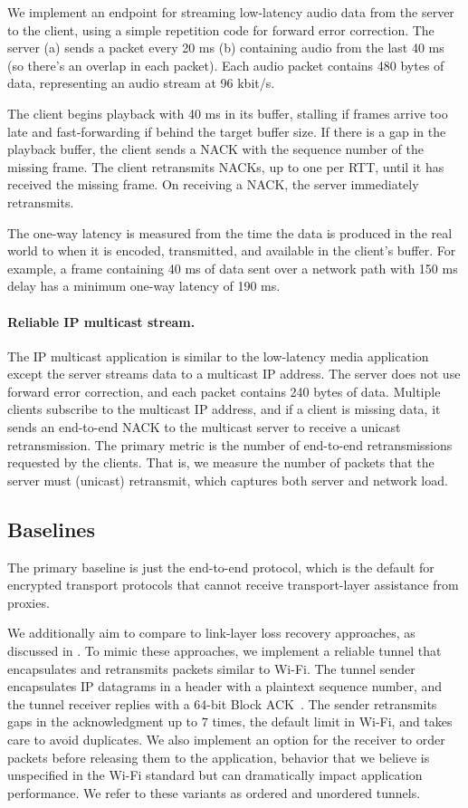 We implement an endpoint for streaming low-latency audio data from the server
to the client, using a simple repetition code for forward error correction.
The server (a) sends a packet every 20 ms
(b) containing audio from the last 40 ms (so there's an overlap in each
packet). Each audio packet contains 480 bytes of data, representing an audio
stream at 96 kbit/s.

The client begins playback with 40 ms in its buffer, stalling if frames arrive
too late and fast-forwarding if behind the target buffer size.
If there is a gap in the
playback buffer, the client sends a NACK with the sequence number of the
missing frame. The client retransmits NACKs, up to one per RTT, until it has
received the missing frame. On receiving a NACK, the server immediately
retransmits.

The one-way latency is measured from the time the data is produced in the real
world to when it is encoded, transmitted, and available in the client's
buffer. For example, a frame containing 40 ms of data sent over a network path
with 150 ms delay has a minimum one-way latency of 190 ms.

\paragraph{Reliable IP multicast stream.}

The IP multicast application is similar to the low-latency media application
except the server streams data to a multicast IP address. The server does not
use forward error correction, and each packet contains 240 bytes of data. Multiple clients
subscribe to the multicast IP address, and if a client is missing data,
it sends an end-to-end NACK to the
multicast server to receive a unicast retransmission.
The primary metric is the number of end-to-end retransmissions requested by
the clients. That is, we measure the number of packets that the server
must (unicast) retransmit, which captures both server and network load.

\subsection{Baselines}

The primary baseline is just the end-to-end protocol, which is the default for
encrypted transport protocols that cannot receive transport-layer assistance
from proxies. 

We additionally aim to compare \Sys to link-layer loss recovery approaches,
as discussed in .
To mimic these approaches,
we implement a reliable tunnel that
encapsulates and retransmits packets
similar to Wi-Fi. The tunnel sender encapsulates IP datagrams in a header with
a plaintext sequence number, and the tunnel receiver replies with a 64-bit
Block ACK~\cite{ieee80211e}. The sender retransmits gaps in the acknowledgment up
to $7$ times, the default limit in Wi-Fi, and takes care to avoid duplicates. We
also implement an option for the receiver to order packets before releasing
them to the application, behavior that we believe is unspecified in the Wi-Fi
standard but can dramatically impact application performance.
We refer to these variants as ordered and unordered tunnels.

